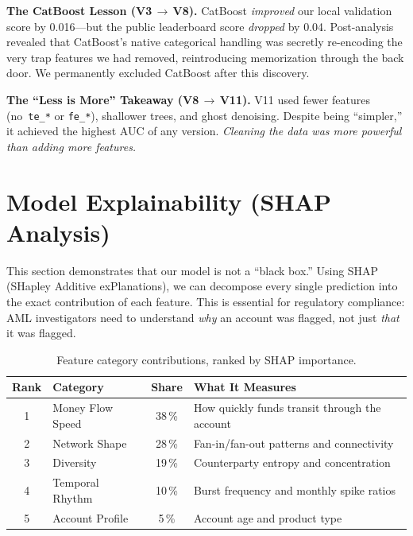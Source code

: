 \documentclass[11pt, a4paper]{article}
\begin{document}
\textbf{The CatBoost Lesson (V3\,$\to$\,V8).}\quad
CatBoost \emph{improved} our local validation score by 0.016---but the public leaderboard
score \emph{dropped} by 0.04. Post-analysis revealed that CatBoost's native categorical
handling was secretly re-encoding the very trap features we had removed, reintroducing
memorization through the back door. We permanently excluded CatBoost after this discovery.

\textbf{The ``Less is More'' Takeaway (V8\,$\to$\,V11).}\quad
V11 used fewer features (no~\texttt{te\_*} or \texttt{fe\_*}), shallower trees, and ghost
denoising. Despite being ``simpler,'' it achieved the highest AUC of any version.
\emph{Cleaning the data was more powerful than adding more features.}


\section{Model Explainability (SHAP Analysis)}

This section demonstrates that our model is not a ``black box.'' Using SHAP (SHapley
Additive exPlanations), we can decompose every single prediction into the exact contribution
of each feature. This is essential for regulatory compliance: AML investigators need to
understand \emph{why} an account was flagged, not just \emph{that} it was flagged.

\begin{table}[H]
\centering\small
\caption{Feature category contributions, ranked by SHAP importance.}
\begin{tabular}{@{}clcp{5.5cm}@{}}
\toprule
\textbf{Rank} & \textbf{Category} & \textbf{Share} & \textbf{What It Measures} \\
\midrule
1 & Money Flow Speed   & 38\,\% & How quickly funds transit through the account \\
2 & Network Shape      & 28\,\% & Fan-in/fan-out patterns and connectivity \\
3 & Diversity          & 19\,\% & Counterparty entropy and concentration \\
4 & Temporal Rhythm    & 10\,\% & Burst frequency and monthly spike ratios \\
5 & Account Profile    &  5\,\% & Account age and product type \\
\bottomrule
\end{tabular}
\end{table}
\end{document}

